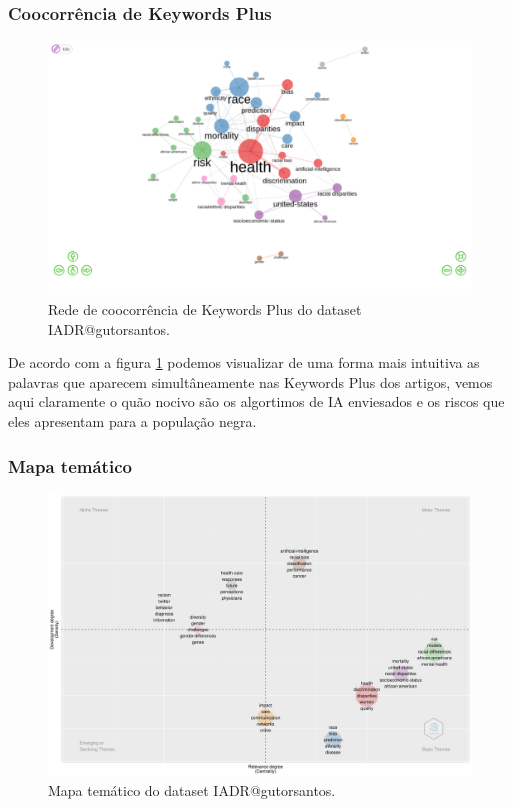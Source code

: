 \subsubsection{Coocorrência de Keywords Plus}

\begin{figure}
    \centering
\includegraphics[angle=0,width=1\textwidth]{experiments/gutorsantos/AnaliseBibliometrica/IAeDiscriminacao/imgs/CoOccurrence.png}
    \caption{Rede de coocorrência de Keywords Plus do dataset IADR@gutorsantos.}
    \label{fig:IADR@gutorsantos:CoOcorrenceKW}
\end{figure}

De acordo com a figura \ref{fig:IADR@gutorsantos:CoOcorrenceKW} podemos visualizar de uma forma mais intuitiva as palavras que aparecem simultâneamente nas Keywords Plus dos artigos, vemos aqui claramente o quão nocivo são os algortimos de IA enviesados e os riscos que eles apresentam para a população negra.

\subsubsection{Mapa temático}
\begin{figure}
    \centering
\includegraphics[angle=0,width=1\textwidth]{experiments/gutorsantos/AnaliseBibliometrica/IAeDiscriminacao/imgs/ThematicMap-2022-02-09.png}
    \caption{Mapa temático do dataset IADR@gutorsantos.}
    \label{fig:IADR@gutorsantos:ThematicMap}
\end{figure}


